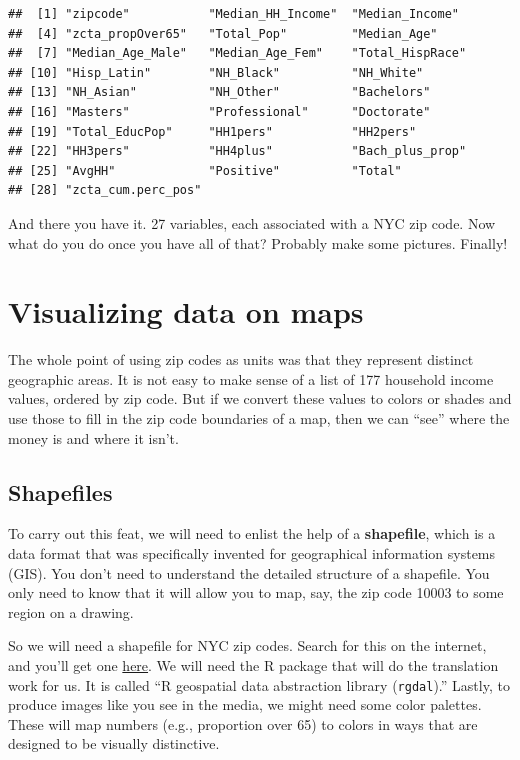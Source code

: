 \documentclass[
  openany]{book}
\begin{document}
\begin{verbatim}
##  [1] "zipcode"           "Median_HH_Income"  "Median_Income"    
##  [4] "zcta_propOver65"   "Total_Pop"         "Median_Age"       
##  [7] "Median_Age_Male"   "Median_Age_Fem"    "Total_HispRace"   
## [10] "Hisp_Latin"        "NH_Black"          "NH_White"         
## [13] "NH_Asian"          "NH_Other"          "Bachelors"        
## [16] "Masters"           "Professional"      "Doctorate"        
## [19] "Total_EducPop"     "HH1pers"           "HH2pers"          
## [22] "HH3pers"           "HH4plus"           "Bach_plus_prop"   
## [25] "AvgHH"             "Positive"          "Total"            
## [28] "zcta_cum.perc_pos"
\end{verbatim}

And there you have it. 27 variables, each associated with a NYC zip code. Now what do you do once you have all of that? Probably make some pictures. Finally!

\hypertarget{mapviz}{%
\section{Visualizing data on maps}\label{mapviz}}

The whole point of using zip codes as units was that they represent distinct geographic areas. It is not easy to make sense of a list of 177 household income values, ordered by zip code. But if we convert these values to colors or shades and use those to fill in the zip code boundaries of a map, then we can ``see'' where the money is and where it isn't.

\hypertarget{shapefiles}{%
\subsection*{Shapefiles}\label{shapefiles}}

To carry out this feat, we will need to enlist the help of a \textbf{shapefile}, which is a data format that was specifically invented for geographical information systems (GIS). You don't need to understand the detailed structure of a shapefile. You only need to know that it will allow you to map, say, the zip code 10003 to some region on a drawing.

So we will need a shapefile for NYC zip codes. Search for this on the internet, and you'll get one \href{https://catalog.data.gov/dataset/zip-code-boundaries}{here}. We will need the R package that will do the translation work for us. It is called ``R geospatial data abstraction library (\texttt{rgdal}).'' Lastly, to produce images like you see in the media, we might need some color palettes. These will map numbers (e.g., proportion over 65) to colors in ways that are designed to be visually distinctive.
\end{document}

